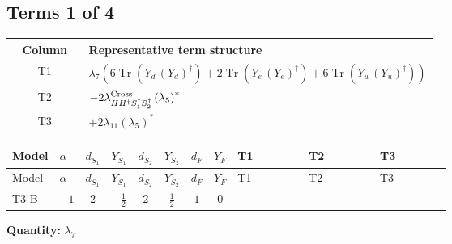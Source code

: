\documentclass[8pt]{article}
\begin{document}
\begin{landscape}
\subsection*{Terms 1 of 4}
\begin{center}
\begin{tabular}{@{}c >{\raggedright\arraybackslash}p{0.82\linewidth}@{}}
\toprule
Column & Representative term structure \\
\midrule
T1 & \(\displaystyle {\lambda_7} (6 \operatorname{Tr}\!\left({Y_d}\,\left({Y_d}\right)^{\dagger}\right)+2 \operatorname{Tr}\!\left({Y_e}\,\left({Y_e}\right)^{\dagger}\right)+6 \operatorname{Tr}\!\left({Y_u}\,\left({Y_u}\right)^{\dagger}\right))\) \\
\midrule
T2 & \(\displaystyle -2 {\lambda_{H H^\dagger S_1^\dagger S_2^\dagger}^{\rm Cross}} \left({\lambda_5}\right)^{*}\) \\
\midrule
T3 & \(\displaystyle +2 {\lambda_{11}} \left({\lambda_5}\right)^{*}\) \\
\midrule
\bottomrule
\end{tabular}
\end{center}
\smallskip
\tiny
\begin{longtable}{@{}llcccccc >{\raggedright\arraybackslash}p{0.21\linewidth} >{\raggedright\arraybackslash}p{0.21\linewidth} >{\raggedright\arraybackslash}p{0.21\linewidth}@{}}
\toprule
Model & $\alpha$ & $d_{S_1}$ & $Y_{S_1}$ & $d_{S_2}$ & $Y_{S_2}$ & $d_F$ & $Y_F$ & T1 & T2 & T3 \\
\midrule
\endfirsthead
\toprule
Model & $\alpha$ & $d_{S_1}$ & $Y_{S_1}$ & $d_{S_2}$ & $Y_{S_2}$ & $d_F$ & $Y_F$ & T1 & T2 & T3 \\
\midrule
\endhead
T3-B & $-1$ & $2$ & $-\frac{1}{2}$ & $2$ & $\frac{1}{2}$ & $1$ & $0$ & \scriptsize\adjustbox{max width=\linewidth}{$\begin{gathered} {\lambda_7} (6 \operatorname{Tr}\!\left({Y_d}\,\left({Y_d}\right)^{\dagger}\right)+2 \operatorname{Tr}\!\left({Y_e}\,\left({Y_e}\right)^{\dagger}\right)+6 \operatorname{Tr}\!\left({Y_u}\,\left({Y_u}\right)^{\dagger}\right))\end{gathered}$} & \scriptsize\adjustbox{max width=\linewidth}{$\begin{gathered} -2 {\lambda_{H H^\dagger S_1^\dagger S_2^\dagger}^{\rm Cross}} \left({\lambda_5}\right)^{*}\end{gathered}$} & \scriptsize\adjustbox{max width=\linewidth}{$\begin{gathered} +2 {\lambda_{11}} \left({\lambda_5}\right)^{*}\end{gathered}$} \\
\midrule
\bottomrule
\end{longtable}
\clearpage
\noindent\textbf{Quantity: }$\lambda_{7}$\par\smallskip

\end{landscape}
\end{document}

